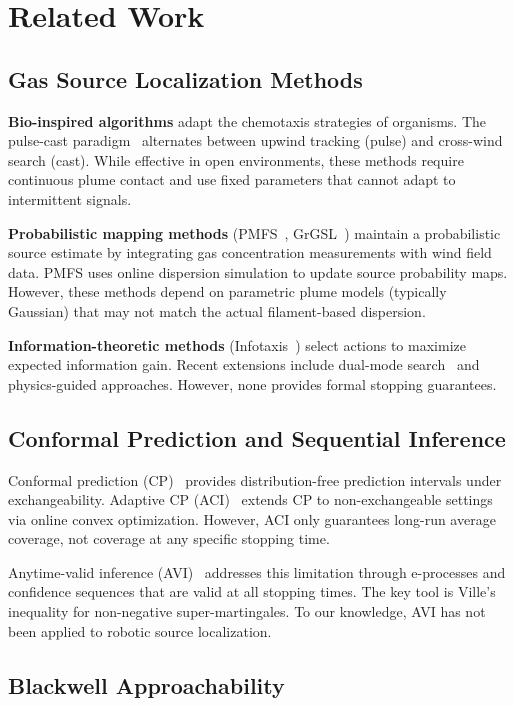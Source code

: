 \section{Related Work}
\label{sec:related}

\subsection{Gas Source Localization Methods}

\textbf{Bio-inspired algorithms} adapt the chemotaxis strategies of organisms. The pulse-cast paradigm~\cite{ref1,ref2} alternates between upwind tracking (pulse) and cross-wind search (cast). While effective in open environments, these methods require continuous plume contact and use fixed parameters that cannot adapt to intermittent signals.

\textbf{Probabilistic mapping methods} (PMFS~\cite{ref6}, GrGSL~\cite{ref7}) maintain a probabilistic source estimate by integrating gas concentration measurements with wind field data. PMFS uses online dispersion simulation to update source probability maps. However, these methods depend on parametric plume models (typically Gaussian) that may not match the actual filament-based dispersion.

\textbf{Information-theoretic methods} (Infotaxis~\cite{ref8}) select actions to maximize expected information gain. Recent extensions include dual-mode search~\cite{ref4} and physics-guided approaches. However, none provides formal stopping guarantees.

\subsection{Conformal Prediction and Sequential Inference}

Conformal prediction (CP)~\cite{ref9} provides distribution-free prediction intervals under exchangeability. Adaptive CP (ACI)~\cite{ref15} extends CP to non-exchangeable settings via online convex optimization. However, ACI only guarantees long-run average coverage, not coverage at any specific stopping time.

Anytime-valid inference (AVI)~\cite{ref10,ref11} addresses this limitation through e-processes and confidence sequences that are valid at all stopping times. The key tool is Ville's inequality for non-negative super-martingales. To our knowledge, AVI has not been applied to robotic source localization.

\subsection{Blackwell Approachability}

